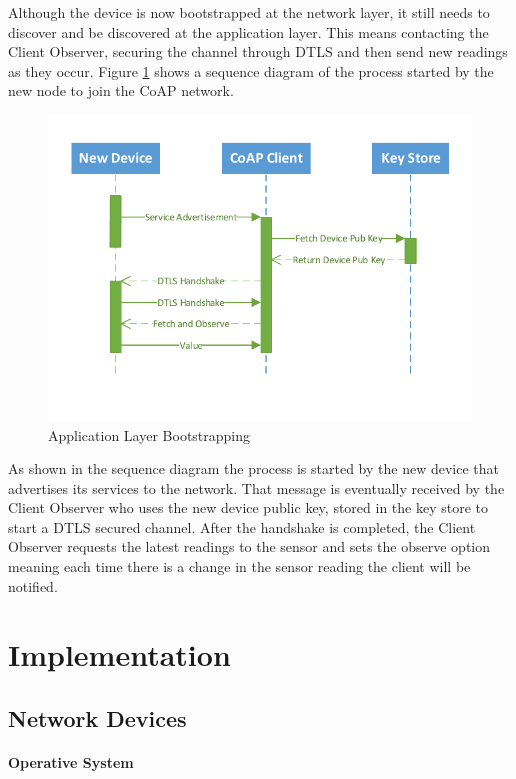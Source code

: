 Although the device is now bootstrapped at the network layer, it still needs to discover and be discovered at the application layer. This means contacting the Client Observer, securing the channel through \gls{DTLS} and then send new readings as they occur. Figure \ref{fig:sequence_application_admission} shows a sequence diagram of the process started by the new node to join the \gls{CoAP} network.

\begin{figure}[h]
  \centering
  \includegraphics[width=0.8\linewidth]{figures/Sequence_Application_Admission.pdf}
  \caption{Application Layer Bootstrapping}
  \label{fig:sequence_application_admission}
\end{figure}

As shown in the sequence diagram the process is started by the new device that advertises its services to the network. That message is eventually received by the Client Observer who uses the new device public key, stored in the key store to start a \gls{DTLS} secured channel. After the handshake is completed, the Client Observer requests the latest readings to the sensor and sets the observe option meaning each time there is a change in the sensor reading the client will be notified.

\section{Implementation}

\subsection{Network Devices}

\paragraph{\textbf{Operative System}}
